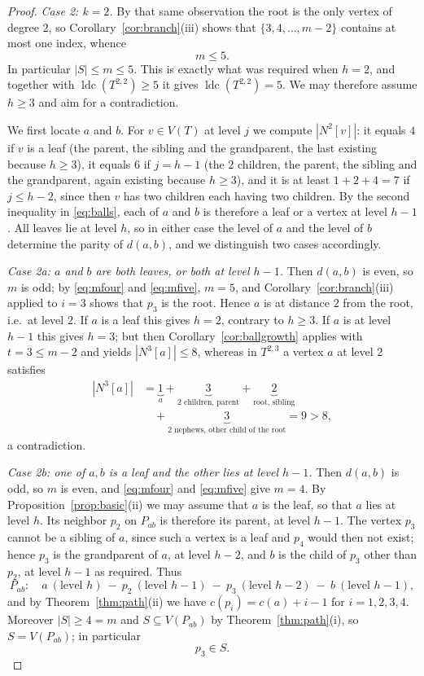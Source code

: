 \documentclass[reqno,10pt]{article}
\theoremstyle{definition}
\numberwithin{equation}{section}
\numberwithin{theorem}{section}
\newcommand{\ldc}{\operatorname{ldc}}
\newcommand{\Ball}[2]{N^{#2}[#1]}
\begin{document}
\begin{proof}
\smallskip
\emph{Case 2: $k=2$.} By that same observation the root is the only vertex of
degree $2$, so Corollary~\ref{cor:branch}(iii) shows that $\{3,4,\dots,m-2\}$
contains at most one index, whence
\begin{equation}
  m\le5 .
  \label{eq:mfive}
\end{equation}
In particular $|S|\le m\le5$. This is exactly what was required when $h=2$, and
together with $\ldc(T^{2,2})\ge5$ it gives $\ldc(T^{2,2})=5$. We may therefore
assume $h\ge3$ and aim for a contradiction.

We first locate $a$ and $b$. For $v\in V(T)$ at level $j$ we compute
$|\Ball{v}{2}|$: it equals $4$ if $v$ is a leaf (the parent, the sibling and the
grandparent, the last existing because $h\ge3$), it equals $6$ if $j=h-1$ (the
$2$ children, the parent, the sibling and the grandparent, again existing
because $h\ge3$), and it is at least $1+2+4=7$ if $j\le h-2$, since then $v$ has
two children each having two children. By the second inequality in
\eqref{eq:balls}, each of $a$ and $b$ is therefore a leaf or a vertex at level
$h-1$. All leaves lie at level $h$, so in either case the level of $a$ and the
level of $b$ determine the parity of $d(a,b)$, and we distinguish two cases
accordingly.

\smallskip
\emph{Case 2a: $a$ and $b$ are both leaves, or both at level $h-1$.} Then
$d(a,b)$ is even, so $m$ is odd; by \eqref{eq:mfour} and \eqref{eq:mfive},
$m=5$, and Corollary~\ref{cor:branch}(iii) applied to $i=3$ shows that $p_3$ is
the root. Hence $a$ is at distance $2$ from the root, i.e.\ at level $2$. If
$a$ is a leaf this gives $h=2$, contrary to $h\ge3$. If $a$ is at level $h-1$
this gives $h=3$; but then Corollary~\ref{cor:ballgrowth} applies with
$t=3\le m-2$ and yields $|\Ball{a}{3}|\le8$, whereas in $T^{2,3}$ a vertex $a$
at level $2$ satisfies
\[
\begin{aligned}
  |\Ball{a}{3}|
  & =\underbrace{1}_{a}+\underbrace{3}_{\text{2 children, parent}}
    +\underbrace{2}_{\text{root, sibling}}\\
  &\quad+\underbrace{3}_{\text{2 nephews, other child of the root}}=9>8,
\end{aligned}
\]
a contradiction.

\smallskip
\emph{Case 2b: one of $a,b$ is a leaf and the other lies at level $h-1$.} Then
$d(a,b)$ is odd, so $m$ is even, and \eqref{eq:mfour} and \eqref{eq:mfive} give
$m=4$. By Proposition~\ref{prop:basic}(ii) we may assume that $a$ is the leaf,
so that $a$ lies at level $h$. Its neighbor $p_2$ on $P_{ab}$ is therefore its
parent, at level $h-1$. The vertex $p_3$ cannot be a sibling of $a$, since such
a vertex is a leaf and $p_4$ would then not exist; hence $p_3$ is the
grandparent of $a$, at level $h-2$, and $b$ is the child of $p_3$ other than
$p_2$, at level $h-1$ as required. Thus
\[
  P_{ab}:\quad
  a\ (\text{level } h)
  \ -\ p_2\ (\text{level } h-1)
  \ -\ p_3\ (\text{level } h-2)
  \ -\ b\ (\text{level } h-1),
\]
and by Theorem~\ref{thm:path}(ii) we have $c(p_i)=c(a)+i-1$ for $i=1,2,3,4$.
Moreover $|S|\ge4=m$ and $S\subseteq V(P_{ab})$ by Theorem~\ref{thm:path}(i), so
$S=V(P_{ab})$; in particular
\[
  p_3\in S .
\]


\end{proof}
\end{document}
